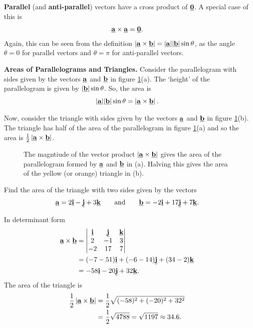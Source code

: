 \textbf{Parallel} (and \textbf{anti-parallel}) vectors have a cross product of $\underline{\mathbf{0}}$. A special case of this is
\[
\underline{\mathbf{a}}\times\underline{\mathbf{a}}=\underline{\mathbf{0}}.
\]
Again, this can be seen from the definition $
\left\lvert\underline{\mathbf{a}}\times\underline{\mathbf{b}}\right\rvert
=\lvert\underline{\mathbf{a}}\rvert\lvert\underline{\mathbf{b}}\rvert\sin\theta$,
as the angle $\theta=0$ for parallel vectors and $\theta=\pi$ for anti-parallel vectors.

\textbf{Areas of Parallelograms and Triangles.} Consider the parallelogram with sides given by the vectors $\underline{\mathbf{a}}$ and $\underline{\mathbf{b}}$ in figure \ref{fig:parallelo}(a). The `height' of the parallelogram is given by $\lvert\underline{\mathbf{b}}\rvert\sin\theta$. So, the area is
\[
\lvert\underline{\mathbf{a}}\rvert\lvert\underline{\mathbf{b}}\rvert\sin\theta
=\left\lvert\underline{\mathbf{a}}\times\underline{\mathbf{b}}\right\rvert.
\]

Now, consider the triangle with sides given by the vectors $\underline{\mathbf{a}}$ and $\underline{\mathbf{b}}$ in figure \ref{fig:parallelo}(b). The triangle has half of the area of the parallelogram in figure \ref{fig:parallelo}(a) and so the area is $\frac{1}{2}\left\lvert \underline{\mathbf{a}}\times\underline{\mathbf{b}} \right\rvert$.
\begin{figure}
    \centering
    \caption{The magntiude of the vector product $\left\lvert\underline{\mathbf{a}}\times\underline{\mathbf{b}}\right\rvert$ gives the area of the parallelogram formed by $\underline{\mathbf{a}}$ and $\underline{\mathbf{b}}$ in (a). Halving this gives the area of the yellow (or orange) triangle in (b).}
    \label{fig:parallelo}
\end{figure}

\begin{example}[Lecture]
Find the area of the triangle with two sides given by the vectors
\[
\underline{\mathbf{a}}=2\underline{\mathbf{i}}-\underline{\mathbf{j}}+3\underline{\mathbf{k}}
\qquad\text{and}\qquad
\underline{\mathbf{b}}=-2\underline{\mathbf{i}}+17\underline{\mathbf{j}}+7\underline{\mathbf{k}}.
\]
\end{example}

\begin{solution}
In determinant form
\begin{align*}
\underline{\mathbf{a}}\times\underline{\mathbf{b}}
&=
\begin{vmatrix}
\underline{\mathbf{i}}&\underline{\mathbf{j}}&\underline{\mathbf{k}}\\
2&-1&3\\
-2&17&7
\end{vmatrix}\\
&=(-7-51)\underline{\mathbf{i}}+(-6-14)\underline{\mathbf{j}}+(34-2)\underline{\mathbf{k}}\\
&=-58\underline{\mathbf{i}}-20\underline{\mathbf{j}}+32\underline{\mathbf{k}}.
\end{align*}
The area of the triangle is
\begin{align*}
\frac{1}{2}\left\lvert\underline{\mathbf{a}}\times\underline{\mathbf{b}}\right\rvert
&=\frac{1}{2}\sqrt{(-58)^2+(-20)^2+32^2}\\
&=\frac{1}{2}\sqrt{4788} =\sqrt{1197} \approx 34.6.
\end{align*}
\end{solution}

